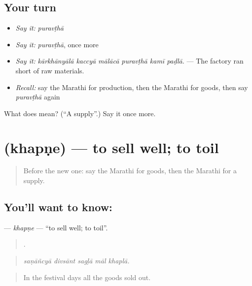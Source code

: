 \subsection*{Your turn}
\begin{itemize}
\raggedright
  \item \emph{Say it:} \emph{puravṭhā}
  \item \emph{Say it:} \emph{puravṭhā}, once more
  \item \emph{Say it:} \emph{kārkhānyālā kaccyā mālācā puravṭhā kamī paḍlā.} — The factory ran short of raw materials.
  \item \emph{Recall:} say the Marathi for production, then the Marathi for goods, then say \emph{puravṭhā} again
\end{itemize}

\begin{tcolorbox}[breakable,colback=teal!4,colframe=teal!35!black,title={Before you move on}]
What does  mean? (\textquotedblleft{}A supply\textquotedblright{}.) Say it once more.
\end{tcolorbox}
\section[\texorpdfstring{\mr{खपणे} (khapṇe)}{खपणे (khapṇe)}]{ (khapṇe) — to sell well; to toil}

\label{lesson:MR-C512-khapne}



\begin{quote}
Before the new one: say the Marathi for goods, then the Marathi for a supply.
\end{quote}

\subsection*{You'll want to know: }
\textbf{} — \emph{khapṇe} — \textquotedblleft{}to sell well; to toil\textquotedblright{}.

\begin{quote}
    .
\end{quote}

\begin{quote}
\emph{saṇāñcyā divsānt sagḷā māl khaplā.}
\end{quote}

\begin{quote}
In the festival days all the goods sold out.
\end{quote}

